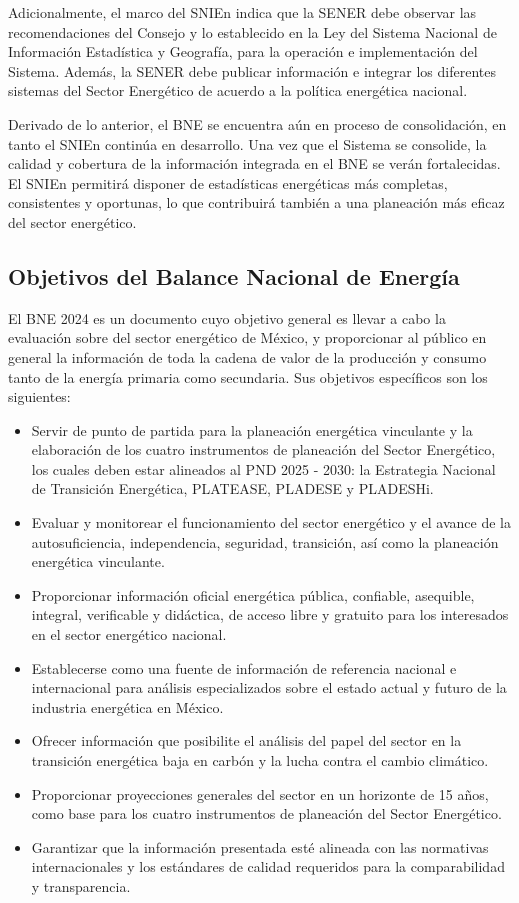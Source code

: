 \documentclass{sener2025}
\begin{document}
Adicionalmente, el marco del SNIEn indica que la SENER debe observar las recomendaciones del Consejo y lo establecido en la Ley del Sistema Nacional de Información Estadística y Geografía, para la operación e implementación del Sistema. Además, la SENER debe publicar información e integrar los diferentes sistemas del Sector Energético de acuerdo a la política energética nacional.

Derivado de lo anterior, el BNE se encuentra aún en proceso de consolidación, en tanto el SNIEn continúa en desarrollo. Una vez que el Sistema se consolide, la calidad y cobertura de la información integrada en el BNE se verán fortalecidas. El SNIEn permitirá disponer de estadísticas energéticas más completas, consistentes y oportunas, lo que contribuirá también a una planeación más eficaz del sector energético.


\subsection{Objetivos del Balance Nacional de Energía}

El BNE 2024 es un documento cuyo objetivo general es llevar a cabo la evaluación sobre del sector energético de México, y proporcionar al público en general la información de toda la cadena de valor de la producción y consumo tanto de la energía primaria como secundaria. Sus objetivos específicos son los siguientes:

\begin{itemize}
  \item Servir de punto de partida para la planeación energética vinculante y la elaboración de los cuatro instrumentos de planeación del Sector Energético, los cuales deben estar alineados al PND 2025 - 2030: la Estrategia Nacional de Transición Energética, PLATEASE, PLADESE y PLADESHi.
  \item Evaluar y monitorear el funcionamiento del sector energético y el avance de la autosuficiencia, independencia, seguridad, transición, así como la planeación energética vinculante.
  \item Proporcionar información oficial energética pública, confiable, asequible, integral, verificable y didáctica, de acceso libre y gratuito para los interesados en el sector energético nacional.
  \item Establecerse como una fuente de información de referencia nacional e internacional para análisis especializados sobre el estado actual y futuro de la industria energética en México.
  \item Ofrecer información que posibilite el análisis del papel del sector en la transición energética baja en carbón y la lucha contra el cambio climático.
  \item Proporcionar proyecciones generales del sector en un horizonte de 15 años, como base para los cuatro instrumentos de planeación del Sector Energético.
  \item Garantizar que la información presentada esté alineada con las normativas internacionales y los estándares de calidad requeridos para la comparabilidad y transparencia.
\end{itemize}
\end{document}
